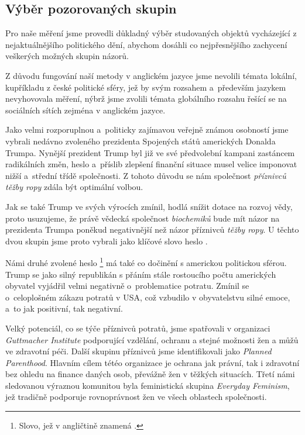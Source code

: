 \documentclass[12pt, a4paper]{article}
\numberwithin{equation}{section} 	%
\begin{document}
\subsection{Výběr pozorovaných skupin}
\noindent Pro naše měření jsme provedli důkladný výběr studovaných objektů vycházející z nejaktuálnějšího politického dění, abychom dosáhli co nejpřesnějšího zachycení veškerých možných skupin názorů.

Z důvodu fungování naší metody v anglickém jazyce jsme nevolili témata lokální, kupříkladu z české politické sféry, jež by svým rozsahem a~především jazykem nevyhovovala měření, nýbrž jsme zvolili témata globálního rozsahu řešící se na sociálních sítích zejména v anglickém jazyce.

Jako velmi rozporuplnou a~politicky zajímavou veřejně známou osobností jsme vybrali nedávno zvoleného prezidenta Spojených států amerických Donalda Trumpa. Nynější prezident Trump byl již ve své předvolební kampani zastáncem radikálních změn, heslo  a~příslib zlepšení finanční situace musel velice imponovat nižší a~střední třídě společnosti. Z tohoto důvodu se nám společnost \textit{příznivců těžby ropy} zdála být optimální volbou.

Jak se také Trump ve svých výrocích zmínil, hodlá snížit dotace na rozvoj vědy, proto usuzujeme, že právě vědecká společnost \textit{biochemiků} bude mít názor na prezidenta Trumpa poněkud negativnější než názor příznivců \textit{těžby ropy}. U těchto dvou skupin jsme proto vybrali jako klíčové slovo heslo \textit{}.

Námi druhé zvolené heslo \textit{}\footnote{Slovo, jež v angličtině znamená \textit{}.} má také co dočinění s americkou politickou sférou. Trump se jako silný republikán s přáním stále rostoucího počtu amerických obyvatel vyjádřil velmi negativně o~problematice potratu. Zmínil se o~celoplošném zákazu potratů v USA, což vzbudilo v obyvatelstvu silné emoce, a~to jak positivní, tak negativní.

Velký potenciál, co se týče příznivců potratů, jsme spatřovali v organizaci \textit{Guttmacher Institute} podporující vzdělání, ochranu a stejné možnosti žen a můžů ve zdravotní péči. Další skupinu příznivců jsme identifikovali jako \textit{Planned Parenthood}. Hlavním cílem tétéo organizace je ochrana jak právní, tak i zdravotní bez ohledu na finance daných osob, převážně žen v těžkých situacích.  Třetí námi sledovanou výraznou komunitou byla feministická skupina \textit{Everyday Feminism}, jež tradičně podporuje rovnoprávnost žen ve všech oblastech společnosti.
\end{document}
